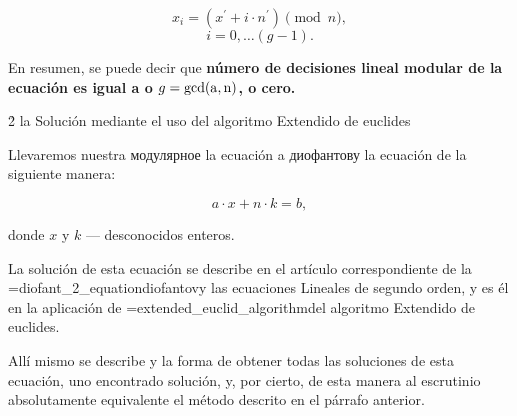 $$x_i = (x^\prime + i \cdot n^\prime) \pmod n,$$
$$i = 0, \ldots (g-1).$$

En resumen, se puede decir que \bf{número de decisiones} lineal modular de la ecuación es igual a o $g = {\rm gcd(a,n)}$, o cero.

\h2{ la Solución mediante el uso del algoritmo Extendido de euclides }

Llevaremos nuestra модулярное la ecuación a диофантову la ecuación de la siguiente manera:

$$a \cdot x + n \cdot k = b,$$

donde $x$ y $k$ --- desconocidos enteros.

La solución de esta ecuación se describe en el artículo correspondiente de la \algohref=diofant_2_equation{diofantovy las ecuaciones Lineales de segundo orden}, y es él en la aplicación de \algohref=extended_euclid_algorithm{del algoritmo Extendido de euclides}.

Allí mismo se describe y la forma de obtener todas las soluciones de esta ecuación, uno encontrado solución, y, por cierto, de esta manera al escrutinio absolutamente equivalente el método descrito en el párrafo anterior.
